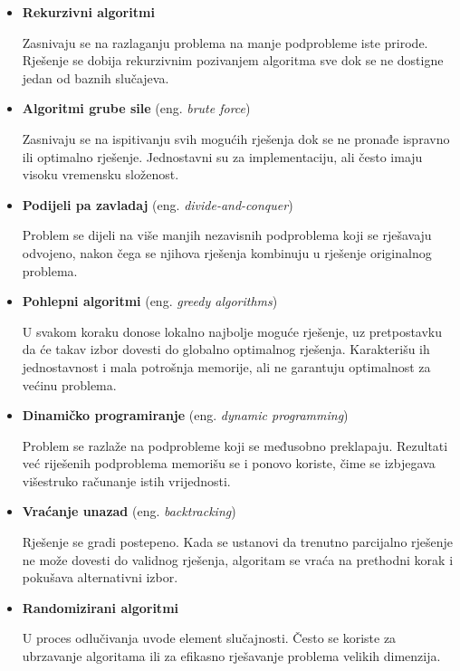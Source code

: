 \begin{itemize}

	\item \textbf{Rekurzivni algoritmi}
	
	Zasnivaju se na razlaganju problema na manje podprobleme iste prirode. Rješenje se dobija rekurzivnim pozivanjem algoritma sve dok se ne dostigne jedan od baznih slučajeva.
	
	\item \textbf{Algoritmi grube sile} (eng. \textit{brute force})
	
	Zasnivaju se na ispitivanju svih mogućih rješenja dok se ne pronađe ispravno ili optimalno rješenje. Jednostavni su za implementaciju, ali često imaju visoku vremensku složenost.
	
	\item \textbf{Podijeli pa zavladaj} (eng. \textit{divide-and-conquer})
	
	Problem se dijeli na više manjih nezavisnih podproblema koji se rješavaju odvojeno, nakon čega se njihova rješenja kombinuju u rješenje originalnog problema.%
	
	\item \textbf{Pohlepni algoritmi} (eng. \textit{greedy algorithms})
	
	U svakom koraku donose lokalno najbolje moguće rješenje, uz pretpostavku da će takav izbor dovesti do globalno optimalnog rješenja. Karakterišu ih jednostavnost i mala potrošnja memorije, ali ne garantuju optimalnost za većinu problema.
	
	\item \textbf{Dinamičko programiranje} (eng. \textit{dynamic programming})
	
	Problem se razlaže na podprobleme koji se međusobno preklapaju. Rezultati već riješenih podproblema memorišu se i ponovo koriste, čime se izbjegava višestruko računanje istih vrijednosti.
	
	\item \textbf{Vraćanje unazad} (eng. \textit{backtracking})
	
	Rješenje se gradi postepeno. Kada se ustanovi da trenutno parcijalno rješenje ne može dovesti do validnog rješenja, algoritam se vraća na prethodni korak i pokušava alternativni izbor.
	
	\item \textbf{Randomizirani algoritmi}
	
	U proces odlučivanja uvode element slučajnosti. Često se koriste za ubrzavanje algoritama ili za efikasno rješavanje problema velikih dimenzija.
	
\end{itemize}

